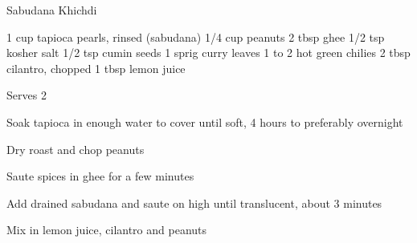 \begin{recipe}{Sabudana Khichdi}{}
\begin{ingredients}
1 cup tapioca pearls, rinsed (sabudana)
1/4 cup peanuts
2 tbsp ghee
1/2 tsp kosher salt
1/2 tsp cumin seeds
1 sprig curry leaves
1 to 2 hot green chilies
2 tbsp cilantro, chopped
1 tbsp lemon juice
\end{ingredients}
\nextcolumn
Serves 2
\begin{steps}
    \item Soak tapioca in enough water to cover until soft, 4 hours to preferably overnight
    \item Dry roast and chop peanuts
    \item Saute spices in ghee for a few minutes
    \item Add drained sabudana and saute on high until translucent, about 3 minutes
    \item Mix in lemon juice, cilantro and peanuts
\end{steps}
\end{recipe}